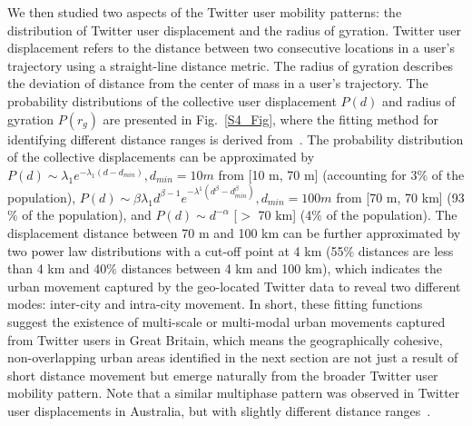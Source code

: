 \documentclass[]{tGIS2e}
\begin{document}
We then studied two aspects of the Twitter user mobility patterns: the distribution of Twitter user displacement and the radius of gyration. 
Twitter user displacement refers to the distance between two consecutive locations in a user's trajectory using a straight-line distance metric.
The radius of gyration describes the deviation of distance from the center of mass in a user's trajectory.
The probability distributions of the collective user displacement $P(d)$ and radius of gyration $P(r_g)$ are presented in Fig.~\ref{S4_Fig}, where the fitting method for identifying different distance ranges is derived from~\citep{jurdak2015}.
The probability distribution of the collective displacements can be approximated by $P(d) \sim \lambda_{1} e^{-\lambda_{1}(d - d_{min})}, d_{min}=10 m$ from [10 m, 70 m] (accounting for 3$\%$ of the population),  $ P(d) \sim \beta\lambda_{1}d^{\beta-1}e^{-\lambda^{1}(d^\beta-d_{min}^\beta)}, d_{min} = 100m$ from [70 m, 70 km] (93$\%$ of the population), and $P(d) \sim {d}^{-\alpha}$ [$>$ 70 km] (4$\%$ of the population). 
The displacement distance between 70 m and 100 km can be further approximated by two power law distributions with a cut-off point at 4 km (55$\%$ distances are less than 4 km and 40$\%$ distances between 4 km and 100 km), which indicates the urban movement captured by the geo-located Twitter data to reveal two different modes: inter-city and intra-city movement. 
In short, these fitting functions suggest the existence of multi-scale or multi-modal urban movements captured from Twitter users in Great Britain, which means the geographically cohesive, non-overlapping urban areas identified in the next section are not just a result of short distance movement but emerge naturally from the broader Twitter user mobility pattern.
Note that a similar multiphase pattern was observed in Twitter user displacements in Australia, but with slightly different distance ranges~\citep{jurdak2015}.
\end{document}
